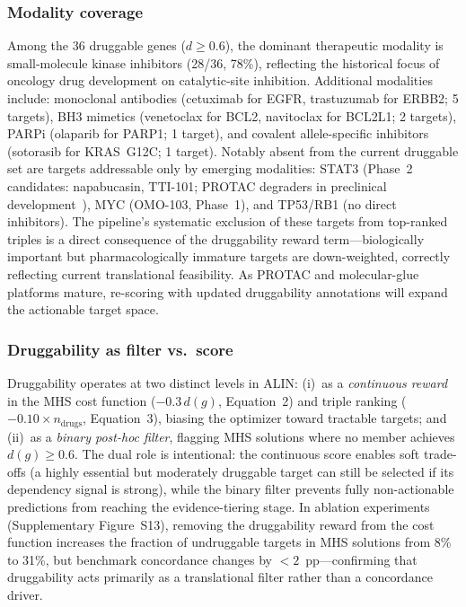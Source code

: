 \documentclass[11pt]{article}
\begin{document}
\subsubsection*{Modality coverage}
Among the 36 druggable genes ($d \geq 0.6$), the dominant therapeutic modality is small-molecule kinase inhibitors (28/36, 78\%), reflecting the historical focus of oncology drug development on catalytic-site inhibition. Additional modalities include: monoclonal antibodies (cetuximab for EGFR, trastuzumab for ERBB2; 5 targets), BH3 mimetics (venetoclax for BCL2, navitoclax for BCL2L1; 2 targets), PARPi (olaparib for PARP1; 1 target), and covalent allele-specific inhibitors (sotorasib for KRAS~G12C; 1 target). Notably absent from the current druggable set are targets addressable only by emerging modalities: STAT3 (Phase~2 candidates: napabucasin, TTI-101; PROTAC degraders in preclinical development~\cite{Bai2019}), MYC (OMO-103, Phase~1), and TP53/RB1 (no direct inhibitors). The pipeline's systematic exclusion of these targets from top-ranked triples is a direct consequence of the druggability reward term---biologically important but pharmacologically immature targets are down-weighted, correctly reflecting current translational feasibility. As PROTAC and molecular-glue platforms mature, re-scoring with updated druggability annotations will expand the actionable target space.

\subsubsection*{Druggability as filter vs.\ score}
Druggability operates at two distinct levels in ALIN: (i)~as a \emph{continuous reward} in the MHS cost function ($-0.3\,d(g)$, Equation~2) and triple ranking ($-0.10 \times n_{\text{drugs}}$, Equation~3), biasing the optimizer toward tractable targets; and (ii)~as a \emph{binary post-hoc filter}, flagging MHS solutions where no member achieves $d(g) \geq 0.6$. The dual role is intentional: the continuous score enables soft trade-offs (a highly essential but moderately druggable target can still be selected if its dependency signal is strong), while the binary filter prevents fully non-actionable predictions from reaching the evidence-tiering stage. In ablation experiments (Supplementary Figure~S13), removing the druggability reward from the cost function increases the fraction of undruggable targets in MHS solutions from 8\% to 31\%, but benchmark concordance changes by $< 2$~pp---confirming that druggability acts primarily as a translational filter rather than a concordance driver.
\end{document}
